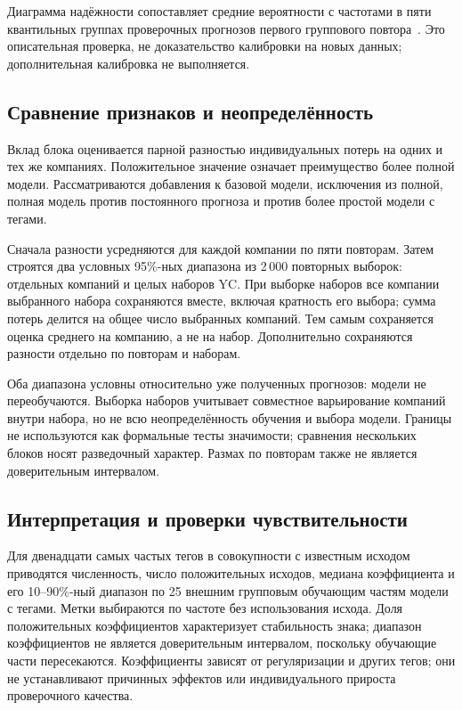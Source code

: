 Диаграмма надёжности сопоставляет средние вероятности с частотами в пяти квантильных группах проверочных прогнозов первого группового повтора~\cite{probability-calibration}. Это описательная проверка, не доказательство калибровки на новых данных; дополнительная калибровка не выполняется.

\subsection{Сравнение признаков и неопределённость}

Вклад блока оценивается парной разностью индивидуальных потерь на одних и тех же компаниях. Положительное значение означает преимущество более полной модели. Рассматриваются добавления к базовой модели, исключения из полной, полная модель против постоянного прогноза и против более простой модели с тегами.

Сначала разности усредняются для каждой компании по пяти повторам. Затем строятся два условных 95\%-ных диапазона из 2\,000 повторных выборок: отдельных компаний и целых наборов YC. При выборке наборов все компании выбранного набора сохраняются вместе, включая кратность его выбора; сумма потерь делится на общее число выбранных компаний. Тем самым сохраняется оценка среднего на компанию, а не на набор. Дополнительно сохраняются разности отдельно по повторам и наборам.

Оба диапазона условны относительно уже полученных прогнозов: модели не переобучаются. Выборка наборов учитывает совместное варьирование компаний внутри набора, но не всю неопределённость обучения и выбора модели. Границы не используются как формальные тесты значимости; сравнения нескольких блоков носят разведочный характер. Размах по повторам также не является доверительным интервалом.

\subsection{Интерпретация и проверки чувствительности}

Для двенадцати самых частых тегов в совокупности с известным исходом приводятся численность, число положительных исходов, медиана коэффициента и его 10--90\%-ный диапазон по 25 внешним групповым обучающим частям модели с тегами. Метки выбираются по частоте без использования исхода. Доля положительных коэффициентов характеризует стабильность знака; диапазон коэффициентов не является доверительным интервалом, поскольку обучающие части пересекаются. Коэффициенты зависят от регуляризации и других тегов; они не устанавливают причинных эффектов или индивидуального прироста проверочного качества.

